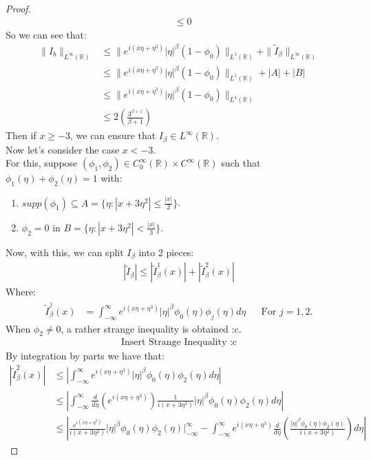 \begin{proof}{}
\begin{align*}
    &\leq 0
  \end{align*}
  So we can see that:
  \begin{align*}
    \|I_{b}\|_{L^{\infty}(\mathbb{R})}&\leq \|e^{i(x\eta+\eta^3)}|\eta|^{\beta}(1-\phi_0)\|_{L^{1}(\mathbb{R})} + \|\tilde{I}_{\beta}\|_{L^{\infty}(\mathbb{R})}\\
    &\leq \|e^{i(x\eta+\eta^3)}|\eta|^{\beta}(1-\phi_0)\|_{L^{1}(\mathbb{R})} + |A| + |B|\\
    &\leq \|e^{i(x\eta+\eta^3)}|\eta|^{\beta}(1-\phi_0)\|_{L^{1}(\mathbb{R})}\\
    &\leq 2\left( \frac{3^{\beta+1}}{\beta+1} \right)
  \end{align*}
  Then if $x\geq -3$, we can ensure that $I_{\beta}\in L^{\infty}(\mathbb{R})$.\\
  Now let’s consider the case $x<-3$.\\
  For this, suppose $(\phi_1,\phi_2)\in C^{\infty}_{0}(\mathbb{R})\times C^{\infty}(\mathbb{R})$ such that $\phi_1(\eta)+\phi_2(\eta)=1$ with:
  \begin{enumerate}
    \item $supp(\phi_1)\subseteq A=\{\eta:|x+3\eta^2|\leq \frac{|x|}{2}\}$.
    \item $\phi_2=0$ in $B=\{\eta:|x+3\eta^2|<\frac{|x|}{3}\}$. 
  \end{enumerate}
  Now, with this, we can split $I_{\beta}$ into 2 pieces:
  \begin{align*}
    |\tilde{I}_{\beta}|\leq |\tilde{I}_{\beta}^{1}(x)|+|\tilde{I}_{\beta}^{2}(x)|
  \end{align*}
  Where:
  \begin{align*}
    \tilde{I}_{\beta}^{j}(x)&=\int_{-\infty}^{\infty}e^{i(x\eta+\eta^3)}|\eta|^{\beta}\phi_0(\eta)\phi_j(\eta)d\eta && \text{For } j=1,2.
  \end{align*}
  When $\phi_2\neq 0$, a rather strange inequality is obtained :c.
  \begin{align*}
    \text{Insert Strange Inequality :c}
  \end{align*}
  By integration by parts we have that:
  \begin{align*}
    |\tilde{I}_{\beta}^{2}(x)|&\leq\left|\int_{-\infty}^{\infty}e^{i(x\eta+\eta^3)}|\eta|^{\beta}\phi_0(\eta)\phi_2(\eta)d\eta \right|\\
    &\leq\left| \int_{-\infty}^{\infty}\frac{d}{d\eta}\left(e^{i(x\eta+\eta^3)}\right)\frac{1}{i(x+3\eta^2)}|\eta|^{\beta}\phi_0(\eta)\phi_2(\eta)d\eta \right|\\
    &\leq \left| \frac{e^{i(x\eta+\eta^3)}}{i(x+3\eta^2)}|\eta|^{\beta}\phi_0(\eta)\phi_2(\eta)\Big|_{-\infty}^{\infty}-\int_{-\infty}^{\infty}e^{i(x\eta+\eta^3)}\frac{d}{d\eta}\left( \frac{|\eta|^{\beta}\phi_0(\eta)\phi_2(\eta)}{i(x+3\eta^2)} \right) d\eta \right|
  \end{align*}
\end{proof}
